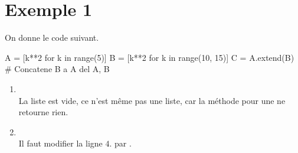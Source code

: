 \section{Exemple 1}

On donne le code suivant.
\begin{code}
  A = [k**2 for k in range(5)]
  B = [k**2 for k in range(10, 15)]
  C = A.extend(B) # Concatene B a A
  del A, B
\end{code}
\begin{enumerate}
  \item {} \\
        La liste  est vide, ce n'est même pas une liste, car la méthode  pour une  ne retourne rien.
  \item {} \\
        Il faut modifier la ligne $4.$ par .
\end{enumerate}

